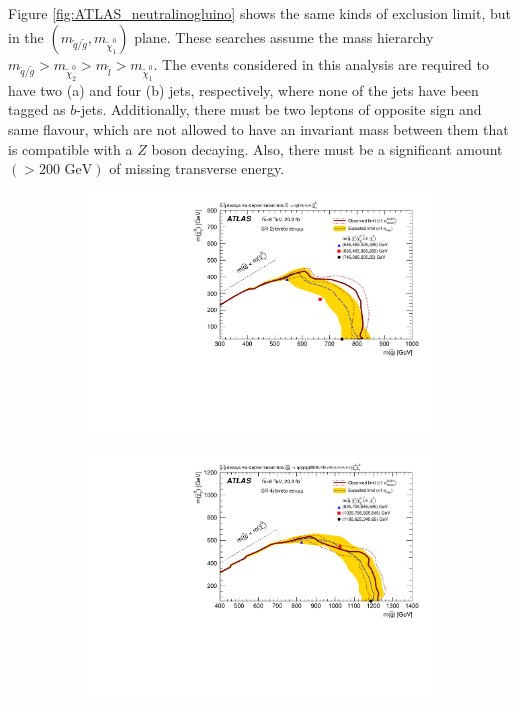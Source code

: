\documentclass[twoside,english]{uiofysmaster}
\begin{document}
Figure \ref{fig:ATLAS_neutralinogluino} shows the same kinds of exclusion limit, but in the $(m_{\tilde q/\tilde g}, m_{\tilde \chi_1^0})$ plane. These searches assume the mass hierarchy $m_{\tilde q/\tilde g} > m_{\tilde \chi_2^0} > m_{\tilde l} > m_{\tilde \chi_1^0}$. The events considered in this analysis are required to have two (a) and four (b) jets, respectively, where none of the jets have been tagged as $b$-jets. Additionally, there must be two leptons of opposite sign and same flavour, which are not allowed to have an invariant mass between them that is compatible with a $Z$ boson decaying. Also, there must be a significant amount $(> 200 \,\,\mathrm{GeV})$ of missing transverse energy.
\begin{figure}[hbt]
\centering
\begin{subfigure}[b]{0.45\textwidth}
	\includegraphics[width=\textwidth]{figures/susyintro/Edge_wband1_wfixSigXSecband1_showcms0_EdgeAnalysisUnblindXsec_SR2jSF.pdf}
	\caption{ }
	\label{fig:ATLAS_neutralinogluino_a}
\end{subfigure}
\begin{subfigure}[b]{0.45\textwidth}
	\includegraphics[width=\textwidth]{figures/susyintro/Edge_wband1_wfixSigXSecband1_showcms0_EdgeAnalysisUnblindXsec_SR4jSF.pdf}

\end{subfigure}
\end{figure}
\end{document}
